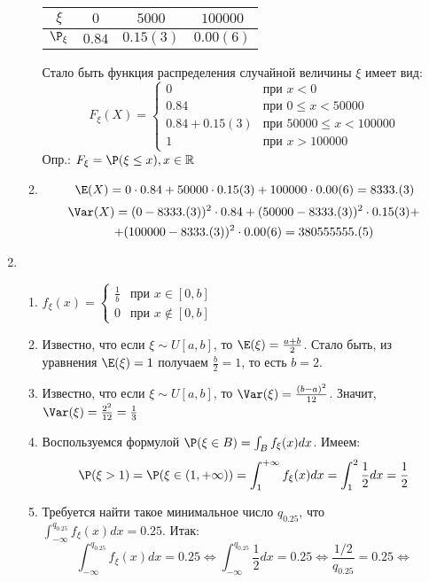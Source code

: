 \begin{enumerate}
\begin{enumerate}
\begin{tabular}{cccc}
\toprule
$\xi$ & $ 0 $ & $5000$ & $100000$ \\ \midrule
$\P_{\xi}$ & $0.84$ & $0.15(3)$ & $0.00(6)$ \\ \bottomrule
\end{tabular}

Стало быть функция распределения случайной величины $\xi$ имеет вид:
\[
F_{\xi} (X) =
\begin{cases}
0 & \text{при } x<0 \\
0.84 & \text{при } 0 \leq x < 50000 \\
0.84 + 0.15(3) & \text{при } 50000
\leq x < 100000 \\
1 & \text{при } x > 100000
\end{cases}
\]
Опр.: $F_{\xi} = \P (\xi \leq x ), x \in \mathbb{R}$
\item \[\E (X) = 0 \cdot 0.84 + 50000 \cdot 0.15(3) + 100000 \cdot 0.00(6) = 8333.(3)	\]
\begin{multline*}
\Var(X) = (0 - 8333.(3))^2 \cdot 0.84 + (50000-8333.(3))^2 \cdot 0.15(3) + \\
+ (100000 - 8333.(3))^2 \cdot 0.00(6) = 380555555.(5)
\end{multline*}
\end{enumerate}
\item
\begin{enumerate}
\item $ f_{\xi} (x)=
\begin{cases}
\frac{1}{b} & \text{при } x \in [0, b] \\
0 & \text{при } x \notin [0, b]
\end{cases}
$
\item  Известно, что если $\xi \sim U[a, b]$, то $\E (\xi) = \frac{a+b}{2}$. Стало быть, из уравнения $\E (\xi) = 1$ получаем $\frac{b}{2} = 1$,  то есть $b=2$.
\item Известно, что если $\xi \sim U[a, b]$, то $\Var (\xi) = \frac{(b-a)^2}{12}$. Значит, $\Var (\xi) = \frac{2^2}{12} = \frac{1}{3}$
\item Воспользуемся формулой $\P (\xi \in B ) = \int_B f_{\xi} (x) dx$. Имеем:
\[
\P (\xi > 1 ) = \P (\xi \in (1, + \infty) ) = \int_{1}^{+ \infty} f_{\xi} (x) dx = \int_{1}^{2} \frac{1}{2} dx = \frac{1}{2}
\]
\item Требуется найти такое минимальное число $q_{0.25}$, что $\int_{-\infty}^{q_{0.25}} f_{\xi} (x) dx = 0.25$. Итак:
\[
\int_{-\infty}^{q_{0.25}} f_{\xi} (x) dx = 0.25 \Leftrightarrow \int_{-\infty}^{q_{0.25}} \frac{1}{2} dx = 0.25 \Leftrightarrow \frac{1/2}{q_{0.25}} = 0.25 \Leftrightarrow
\]
\end{enumerate}
\end{enumerate}
